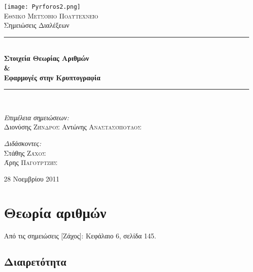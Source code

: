 \documentclass[11pt,a4paper]{book}
\newcommand{\HRule}{\rule{\linewidth}{0.5mm}}
\begin{document}
\begin{titlepage}
\begin{center}

\texttt{[image: Pyrforos2.png]}\\[1.cm]
\textsc{\LARGE Εθνικό Μετσόβιο Πολυτεχνείο}\\[1.5cm]

\Large{ Σημειώσεις Διαλέξεων }\\[0.5cm]

\begin{doublespace}
\HRule \\[0.4cm]
{\huge \bfseries
Στοιχεία Θεωρίας Αριθμών
\\
\&
\\
Εφαρμογές στην Κρυπτογραφία
}\\[0.4cm]
\end{doublespace}

\HRule \\[1.5cm]

\begin{minipage}{0.4\textwidth}
\begin{flushleft} \large
\emph{Επιμέλεια σημειώσεων:}\\
Διονύσης \textsc{Ζήνδρος}
Αντώνης \textsc{Αναστασόπουλος}
\end{flushleft}
\end{minipage}
\begin{minipage}{0.4\textwidth}
\begin{flushright} \large
\emph{Διδάσκοντες:} \\
Στάθης \textsc{Ζάχος}\\
Άρης \textsc{Παγουρτζής}
\end{flushright}
\end{minipage}

\vfill

{\large 28 Νοεμβρίου 2011}
\end{center}
\end{titlepage}

\section*{Θεωρία αριθμών}

Από τις σημειώσεις [Ζάχος]: Κεφάλαιο 6, σελίδα 145.

\subsection*{Διαιρετότητα}
\end{document}
